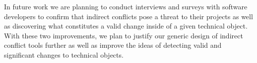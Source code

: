 \documentclass[conference]{IEEEtran}
\begin{document}
In future work we are planning to conduct interviews and surveys
with software developers to confirm that indirect conflicts pose a
threat to their projects as well as discovering what constitutes a 
valid change inside of a given technical object. With these two
improvements, we plan to justify our generic design of indirect
conflict tools further as well as improve the ideas of detecting 
valid and significant changes to technical objects.\\




\end{document}
